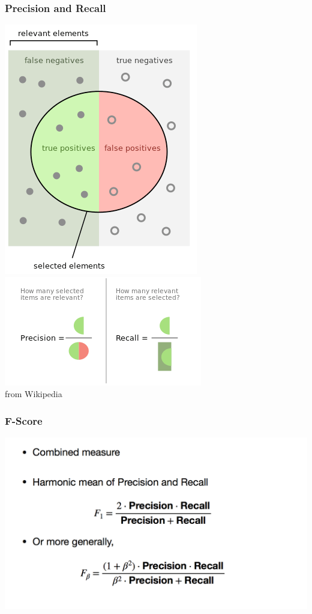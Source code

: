 \begin{frame}
\frametitle{Precision and Recall}
\centering
\includegraphics[scale=0.40]{figures/classifiers/evalterms.png}
\includegraphics[scale=0.40]{figures/classifiers/pr.png}
\\
\footnotesize{from Wikipedia}
\end{frame}

\begin{frame}
\frametitle{F-Score}
\includegraphics[scale=0.25]{figures/classifiers/fscore.png}
\end{frame}

